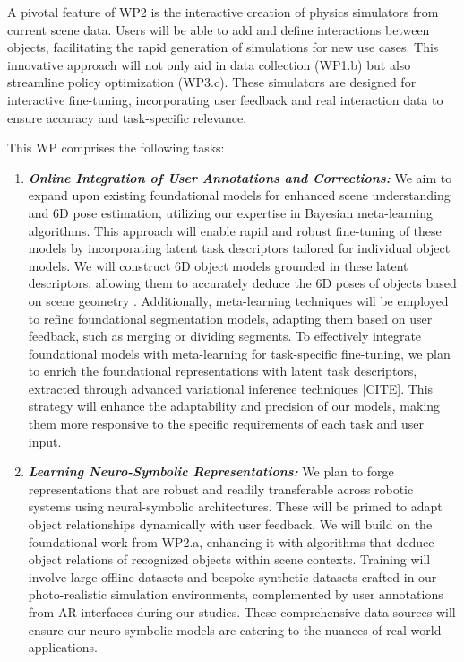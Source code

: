 \documentclass{erc-B2}
\begin{document}
A pivotal feature of WP2 is the interactive creation of physics simulators from current scene data. Users will be able to add and define interactions between objects, facilitating the rapid generation of simulations for new use cases. This innovative approach will not only aid in data collection (WP1.b) but also streamline policy optimization (WP3.c). These simulators are designed for interactive fine-tuning, incorporating user feedback and real interaction data to ensure accuracy and task-specific relevance.

This WP comprises the following tasks:
\begin{enumerate}
\item \textit{\textbf{Online Integration of User Annotations and Corrections:}} We aim to expand upon existing foundational models\cite{SAM,CLIP,LLaMA} for enhanced scene understanding and 6D pose estimation, utilizing our expertise in Bayesian meta-learning algorithms\cite{volpp2021bayesian,Volpp23}. This approach will enable rapid and robust fine-tuning of these models by incorporating latent task descriptors tailored for individual object models. We will construct 6D object models grounded in these latent descriptors, allowing them to accurately deduce the 6D poses of objects based on scene geometry \cite{gao2023sad}. Additionally, meta-learning techniques will be employed to refine foundational segmentation models\cite{SAM}, adapting them based on user feedback, such as merging or dividing segments. To effectively integrate foundational models with meta-learning for task-specific fine-tuning, we plan to enrich the foundational representations with latent task descriptors, extracted through advanced variational inference techniques [CITE]. This strategy will enhance the adaptability and precision of our models, making them more responsive to the specific requirements of each task and user input.


\item \textit{\textbf{Learning Neuro-Symbolic Representations:}} We plan to forge representations that are robust and readily transferable across robotic systems using neural-symbolic architectures. These will be primed to adapt object relationships dynamically with user feedback. We will build on the foundational work from WP2.a, enhancing it with algorithms that deduce object relations of recognized objects within scene contexts. Training will involve large offline datasets and bespoke synthetic datasets crafted in our photo-realistic simulation environments, complemented by user annotations from AR interfaces during our studies. These comprehensive data sources will ensure our neuro-symbolic models are catering to the nuances of real-world applications.



\end{enumerate}
\end{document}
